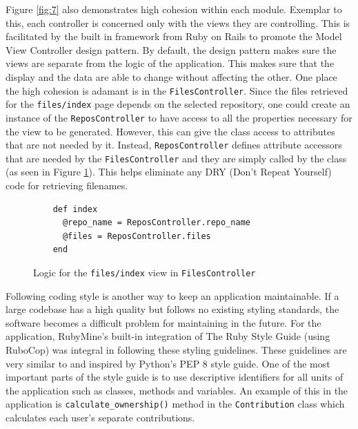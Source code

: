 Figure \ref{fig:7} also demonstrates high cohesion within each module. Exemplar to this, each controller is concerned only with the views they are controlling. This is facilitated by the built in framework from Ruby on Rails to promote the Model View Controller design pattern. By default, the design pattern makes sure the views are separate from the logic of the application. This makes sure that the display and the data are able to change without affecting the other. One place the high cohesion is adamant is in the \texttt{FilesController}. Since the files retrieved for the \texttt{files/index} page depends on the selected repository, one could create an instance of the \texttt{ReposController} to have access to all the properties necessary for the view to be generated. However, this can give the class access to attributes that are not needed by it. Instead, \texttt{ReposController} defines attribute accessors that are needed by the \texttt{FilesController} and they are simply called by the class (as seen in Figure \ref{fig:11}). This helps eliminate any DRY (Don't Repeat Yourself) code for retrieving filenames.

\begin{figure}[h]
    \centering
    \begin{verbatim}
    def index
      @repo_name = ReposController.repo_name
      @files = ReposController.files
    end
    \end{verbatim}
    \caption{Logic for the \texttt{files/index} view in \texttt{FilesController}}
    \label{fig:11}
\end{figure}

Following coding style is another way to keep an application maintainable. If a large codebase has a high quality but follows no existing styling standards, the software becomes a difficult problem for maintaining in the future. For the application, RubyMine's built-in integration of The Ruby Style Guide \citep{batsov_2021} (using RuboCop) was integral in following these styling guidelines. These guidelines are very similar to and inspired by Python's PEP 8 style guide. One of the most important parts of the style guide is to use descriptive identifiers for all units of the application such as classes, methods and variables. An example of this in the application is \texttt{calculate\_ownership()} method in the \texttt{Contribution} class which calculates each user's separate contributions.